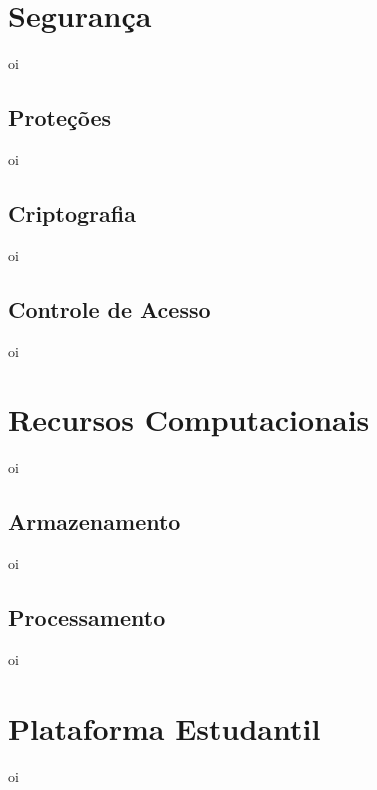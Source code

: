 \section{Segurança}
    \label{sec:seguranca}
    oi
        
        \subsection{Proteções}
        \label{sec:protecoes}
        oi
        
        \subsection{Criptografia}
        \label{sec:criptografia}
        oi
        
        \subsection{Controle de Acesso}
        \label{sec:controle-acesso}
        oi
        
\section{Recursos Computacionais}
\label{sec:recursos-computacionais }
oi

    \subsection{Armazenamento}
    \label{sec:armazenamento}
    oi
    
    \subsection{Processamento}
    \label{sec:processamento}
    oi

\section{Plataforma Estudantil}
\label{sec:plataforma-estudantil}
oi